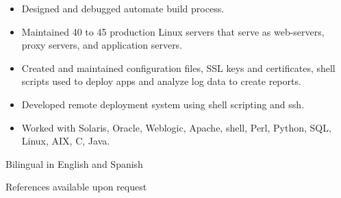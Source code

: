 \documentclass{res}
\begin{document}
\begin{resume}
\begin{itemize}
\item Designed and debugged automate build process.

\item Maintained 40 to 45 production Linux servers that serve as
web-servers, proxy servers, and application servers.

\item Created and maintained configuration files, SSL keys and
certificates, shell scripts used to deploy apps and analyze log data to
create reports.

\item Developed remote deployment system using shell scripting and ssh.

\item  Worked with Solaris, Oracle, Weblogic, Apache, shell, Perl,
Python, SQL, Linux, AIX, C, Java.

\end{itemize}


Bilingual in English and Spanish

References available upon request

\end{resume}
\end{document}
